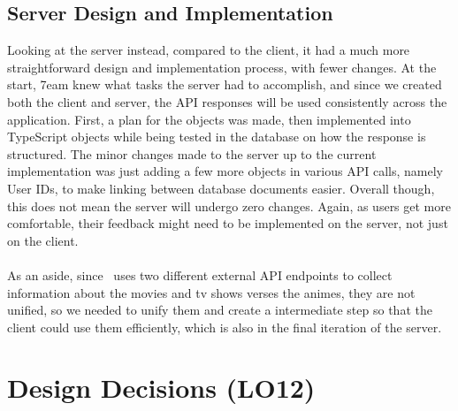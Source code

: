 \documentclass{article}
\begin{document}
\subsection{Server Design and Implementation}
Looking at the server instead, compared to the client, it had a much more straightforward design and implementation process, with fewer changes. At the start, 7eam knew what tasks the server had to accomplish, and since we created both the client and server, the API responses will be used consistently across the application. First, a plan for the objects was made, then implemented into TypeScript objects while being tested in the database on how the response is structured. The minor changes made to the server up to the current implementation was just adding a few more objects in various API calls, namely User IDs, to make linking between database documents easier. Overall though, this does not mean the server will undergo zero changes. Again, as users get more comfortable, their feedback might need to be implemented on the server, not just on the client.
\\~\\ As an aside, since \progname ~uses two different external API endpoints to collect information about the movies and tv shows verses the animes, they are not unified, so we needed to unify them and create a intermediate step so that the client could use them efficiently, which is also in the final iteration of the server.

\section{Design Decisions (LO12)}

 
\end{document}
